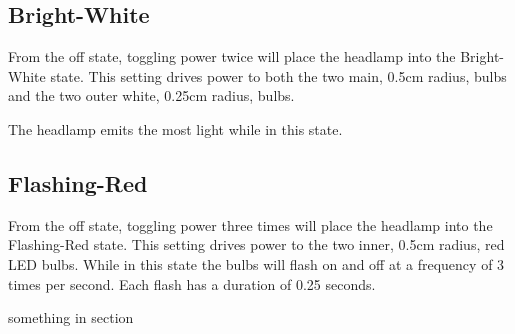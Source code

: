 \documentclass[12pt]{article}
\begin{document}
\subsection{Bright-White}
From the off state, toggling power twice will place the headlamp into the Bright-White state.  This
setting drives power to both the two main, 0.5cm radius, bulbs and the two outer white, 0.25cm radius, bulbs.

The headlamp emits the most light while in this state.

\subsection{Flashing-Red}
From the off state, toggling power three times will place the headlamp into the Flashing-Red state.
This setting drives power to the two inner, 0.5cm radius, red LED bulbs. While in this state the
bulbs will flash on and off at a frequency of 3 times per second. Each flash has a duration of
0.25 seconds.



something in section
\end{document}
